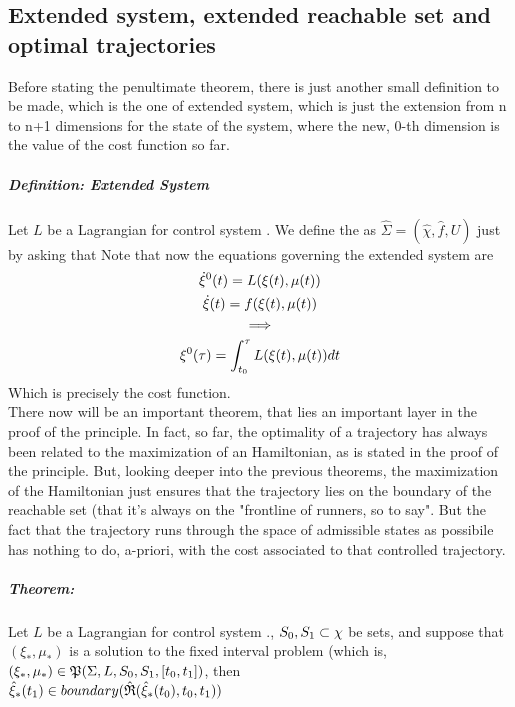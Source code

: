 \subsection{Extended system, extended reachable set and optimal trajectories}
Before stating the penultimate theorem, there is just another small definition to be made, which is the one of extended system, which is just the extension from n to n+1 dimensions for the state of the system, where the new, 0-th dimension is the value of the cost function so far.

\subparagraph[6.1]{Definition: Extended System} Let $L$ be a Lagrangian for control system \controlSystem. We define the  as $\hat{\Sigma}=(\hat\chi,\hat{f},U)$ just by asking that 
Note that now the equations governing the extended system are 
\begin{gather*}
	 \dot{\xi}^0(t)=L(\xi (t),\mu(t))\\
	\dot{\xi}(t)=f(\xi (t),\mu(t))\\
	\implies\\
	\xi^0(\tau)=\int_{t_0}^{\tau}L(\xi (t),\mu(t))dt
\end{gather*}
Which is precisely the cost function.\\
There now will be an important theorem, that lies an important layer in the proof of the principle. In fact, so far, the optimality of a trajectory has always been related to the maximization of an Hamiltonian, as is stated in the proof of the principle. But, looking deeper into the previous theorems, the maximization of the Hamiltonian just ensures that the trajectory lies on the boundary of the reachable set (that it's always on the "frontline of runners, so to say". But the fact that the trajectory runs through the space of admissible states as possibile has nothing to do, a-priori, with the cost associated to that controlled trajectory. 
\subparagraph[6.2]{Theorem:}Let $L$ be a Lagrangian for control system \controlSystem., $S_0,S_1\subset\chi$ be sets, and suppose that $(\xi_*,\mu_*)$ is a solution to the fixed interval problem (which is, $(\xi_*,\mu_*)\in\mathfrak{P}(\Sigma,L,S_0,S_1,[t_0,t_1])$, then\\
$\hat{\xi}_*(t_1)\in boundary(\hat{\mathfrak{R}}(\hat\xi_*(t_0),t_0,t_1))
$